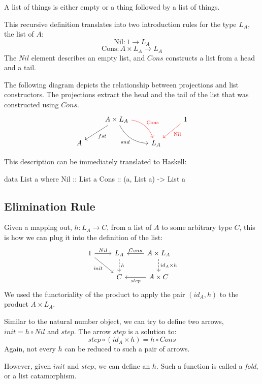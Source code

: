 \documentclass[DaoFP]{subfiles}
\begin{document}
A list of things is either empty or a thing followed by a list of things. 

This recursive definition translates into two introduction rules for the type $L_A$, the list of $A$: 
\[ \text{Nil} \colon 1 \to L_A \]
\[ \text{Cons} \colon A \times L_A \to L_A \]
The $Nil$ element describes an empty list, and $Cons$ constructs a list from a head and a tail. 

The following diagram depicts the relationship between projections and list constructors. The projections extract the head and the tail of the list that was constructed using $Cons$.
\[
 \begin{tikzcd}
 & A \times L_A
 \arrow[ld, "fst"]
 \arrow[rd, bend right, "snd"']
 \arrow[rd, bend left, red, "\text{Cons}"]
 && 1
 \arrow[ld, red, "\text{Nil}"]
 \\
 A
&&L_A
  \end{tikzcd}
\]

This description can be immediately translated to Haskell:
\begin{haskell}
data List a where
  Nil  :: List a
  Cons :: (a, List a) -> List a
\end{haskell}



\subsection{Elimination Rule}

Given a mapping out, $h \colon L_A \to C$, from a list of $A$ to some arbitrary type $C$, this is how we can plug it into the definition of the list:
\[
 \begin{tikzcd}
 1
 \arrow[r, "Nil"]
 \arrow[rd, "\mathit{init}"']
 &L_A
\arrow[d, dashed, "h"]
&A \times L_A
  \arrow[l, "Cons"']
\arrow[d, dashed, "id_A \times h"]
\\
& C
& A \times C
\arrow[l, "\mathit{step}"]
  \end{tikzcd}
\]
We used the functoriality of the product to apply the pair $(id_A, h)$ to the product $A \times L_A$.

Similar to the natural number object, we can try to define two arrows, $\mathit{init} = h \circ Nil$ and $\mathit{step}$. The arrow $\mathit{step}$ is a solution to:
\[ \mathit{step} \circ (id_A \times h) = h \circ Cons \]
Again, not every $h$ can be reduced to such a pair of arrows.

However, given $\mathit{init}$ and $\mathit{step}$, we can define an $h$. Such a function is called a \emph{fold}, or a list catamorphism. 
\end{document}
